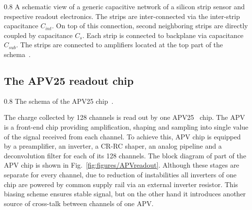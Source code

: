                  {0.8}       %
                 {A schematic view of a generic capacitive network of a silicon strip sensor and respective readout electronics. The strips are inter-connected via the inter-strip capacitance $C_{int}$. On top of this connection, second neighboring strips are directly coupled by capacitance $C_{s}$. Each strip is connected to backplane via capacitance $C_{sub}$. The strips are connected to amplifiers located at the top part of the schema~\cite{Lutz:1987wd}.}




\subsection{The APV25 readout chip \label{sec:APV}}


                 {0.8}       %
                 {The schema of the APV25 chip~\cite{Friedl:2001kra}.} %

The charge collected by 128 channels is read out by one APV25~\cite{French:2001xb} chip. The APV is a front-end chip providing amplification, shaping and sampling into single value of the signal received from each channel. To achieve this, APV chip is equipped by a preamplifier, an inverter, a CR-RC shaper, an analog pipeline and a deconvolution filter for each of its 128 channels. The block diagram of part of the APV chip is shown in Fig.~\ref{fig:figures/APVreadout}. Although these stages are separate for every channel, due to reduction of instabilities all inverters of one chip are powered by common supply rail via an external inverter resistor. This biasing scheme ensures stable signal, but on the other hand it introduces another source of cross-talk between channels of one APV.

